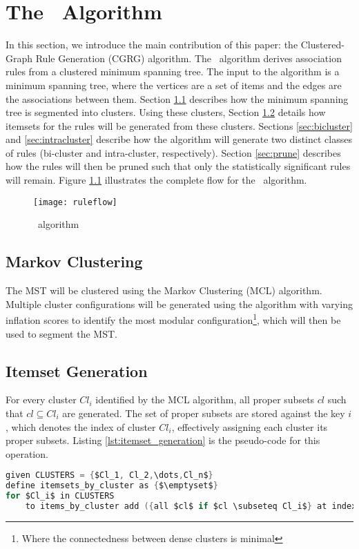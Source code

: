 
\chapter{The \algo\ Algorithm}
In this section, we introduce the main contribution of this paper: the Clustered-Graph Rule Generation (CGRG) algorithm. The \algo\ algorithm derives association rules from a clustered minimum spanning tree. The input to the algorithm is a minimum spanning tree, where the vertices are a set of items and the edges are the associations between them. Section \ref{sec:clustering} describes how the minimum spanning tree is segmented into clusters. Using these clusters, Section \ref{sec:itemsets} details how itemsets for the rules will be generated from these clusters. Sections \ref{sec:bicluster} and \ref{sec:intracluster} describe how the algorithm will generate two distinct classes of rules (bi-cluster and intra-cluster, respectively). Section \ref{sec:prune} describes how the rules will then be pruned such that only the statistically significant rules will remain.
Figure \ref{fig:algorithm_flow} illustrates the complete flow for the \algo\ algorithm.
\begin{figure}[H]
\centering
\texttt{[image: ruleflow]}
\caption{\algo\ algorithm}
\label{fig:algorithm_flow}
\end{figure}


\section{Markov Clustering}
\label{sec:clustering}
The MST will be clustered using the Markov Clustering (MCL) algorithm. Multiple cluster configurations will be generated using the algorithm with varying inflation scores to identify the most modular configuration\footnote{Where the connectedness between dense clusters is minimal}, which will then be used to segment the MST.


\section{Itemset Generation}
\label{sec:itemsets}
For every cluster $Cl_i$ identified by the MCL algorithm, all proper subsets $cl$ such that $cl \subseteq Cl_i$ are generated. The set of proper subsets are stored against the key $i$, which denotes the index of cluster $Cl_i$, effectively assigning each cluster its proper subsets. Listing \ref{lst:itemset_generation} is the pseudo-code for this operation.
\begin{lstlisting}[language=C, mathescape=true, caption=Cluster Itemset Generation, label=lst:itemset_generation]
given CLUSTERS = {$Cl_1, Cl_2,\dots,Cl_n$}
define itemsets_by_cluster as {$\emptyset$}
for $Cl_i$ in CLUSTERS
    to items_by_cluster add ({all $cl$ if $cl \subseteq Cl_i$} at index $i$)
\end{lstlisting}

